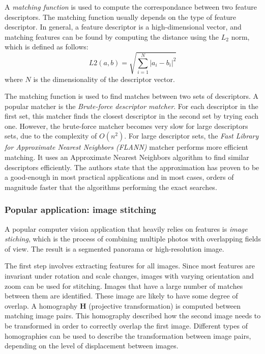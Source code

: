 {A \textit{matching function} is used to compute the correspondance between two feature descriptors.
The matching function usually depends on the type of feature descriptor.
In general, a feature descriptor is a high-dimensional vector, and matching features can be found by computing the distance using the $L_2$ norm, which is defined as follows:
\begin{equation}
L2(a,b) =\sqrt { \sum_{i=1}^{N} \left| a_i - b_i \right| ^2 }
\end{equation}
where $N$ is the dimensionality of the descriptor vector.

The matching function is used to find matches between two sets of descriptors.
A popular matcher is the \textit{Brute-force descriptor matcher}. For each descriptor in the first set, this matcher finds the closest descriptor in the second set by trying each one.
However, the brute-force matcher becomes very slow for large descriptors sets, due to the complexity of $O(n^2)$.
For large descriptor sets, the \textit{Fast Library for Approximate Nearest Neighbors (FLANN)} \cite{muja2009flann} matcher performs more efficient matching.
It uses an Approximate Nearest Neighbors algorithm to find similar descriptors efficiently.
The authors state that the approximation has proven to be a good-enough in most practical applications and in most cases, orders of magnitude faster that the algorithms performing the exact searches.

\subsubsection{Popular application: image stitching}
A popular computer vision application that heavily relies on features is \textit{image stiching}, which is the process of combining multiple photos with overlapping fields of view.
The result is a segmented panorama or high-resolution image. 

The first step involves extracting features for all images.
Since most features are invariant under rotation and scale changes, images with varying orientation and zoom can be used for stitching.
Images that have a large number of matches between them are identified.
These image are likely to have some degree of overlap.
A homography $\boldsymbol{H}$ (projective transformation) is computed between matching image pairs.
This homography described how the second image needs to be transformed in order to correctly overlap the first image.
Different types of homographies can be used to describe the transformation between image pairs, depending on the level of displacement between images.

}
